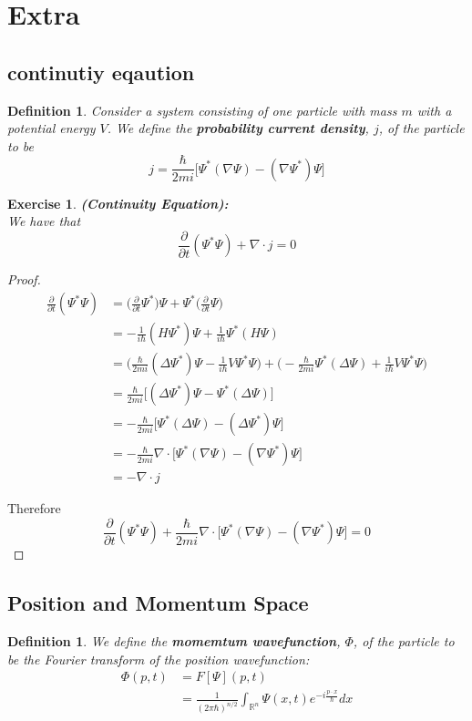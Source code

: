 \documentclass[12pt]{amsart}
\newtheorem{defn}[thm]{Definition}
\newtheorem{ex}[thm]{Exercise}
\newcommand{\Del}{\Delta}
\newcommand{\R}{\mathbb{R}}
\newcommand{\p}[1]{\frac{\partial}{\partial{#1}}}
\begin{document}
\newpage
\section{Extra}

\subsection{continutiy eqaution}

\begin{defn}
	Consider a system consisting of one particle with mass $m$ with a potential energy $V$. We define the \textbf{probability current density}, $j$, of the particle to be $$j = \frac{\hbar}{2mi} \bigg[ \Psi^* (\nabla \Psi) - (\nabla \Psi^*) \Psi\bigg]$$ 
\end{defn}

\begin{ex}\textbf{(Continuity Equation):}\\ 
	We have that $$\p{t} (\Psi^* \Psi) +  \nabla \cdot j = 0 $$
\end{ex}

\begin{proof}
	\begin{align*}
		\p{t}(\Psi^* \Psi) 
		&= \bigg(\p{t} \Psi^* \bigg) \Psi + \Psi^* \bigg(\p{t} \Psi \bigg)\\
		&= -\frac{1}{i\hbar}(H\Psi^*) \Psi + \frac{1}{i\hbar} \Psi^* (H\Psi) \\
		&= \bigg( \frac{\hbar}{2mi} (\Del \Psi^*) \Psi - \frac{1}{i \hbar }V \Psi^* \Psi\bigg) + \bigg( -\frac{\hbar}{2mi}  \Psi^* (\Del \Psi) + \frac{1}{i \hbar }V \Psi^* \Psi \bigg)\\
		&= \frac{\hbar}{2mi} \bigg[ (\Del \Psi^*) \Psi - \Psi^* (\Del \Psi) \bigg]\\
		&= -\frac{\hbar}{2mi} \bigg[ \Psi^* (\Del \Psi) - (\Del \Psi^*) \Psi\bigg]\\
		&= - \frac{\hbar}{2mi} \nabla \cdot \bigg[\Psi^* (\nabla \Psi) - (\nabla \Psi^*) \Psi \bigg]\\
		&= -\nabla \cdot j
	\end{align*}
	
	Therefore  $$\p{t} (\Psi^* \Psi) + \frac{\hbar}{2mi} \nabla \cdot \bigg[ \Psi^* (\nabla \Psi) - (\nabla \Psi^*) \Psi\bigg] = 0 $$
\end{proof}

\subsection{Position and Momentum Space}
\begin{defn}
	We define the \textbf{momemtum wavefunction}, $\Phi$, of the particle to be the Fourier transform of the position wavefunction: 
	\begin{align*}
		\Phi(p,t) 
		&= F[\Psi](p,t)\\
		&= \frac{1}{(2 \pi \hbar)^{n/2}} \int_{\R ^n}\Psi(x,t)e^{-i \frac{p \cdot x}{\hbar} }dx
	\end{align*}
\end{defn}
\end{document}
